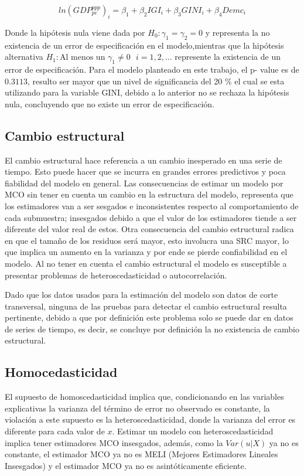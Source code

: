 \documentclass[11pt]{article}
\begin{document}
{$$ ln(GDP_{pc}^{ppp})_i = \beta_1 + \beta_2 IGI_i + \beta_3 GINI_i + \beta_4 Demc_i $$

Donde la hipótesis nula viene dada por $H_0 : \gamma_1 = \gamma_2 = 0$ y representa la no existencia de un error de especificación en el modelo,mientras que la hipótesis alternativa $H_1 : \text{Al menos un } \gamma_1 \neq 0 \ \ \ i=1,2,... $  represente la existencia de un error de especificación. Para el modelo planteado en este trabajo, el p- value es de $0.3113$, resulto ser mayor que un nivel de significancia del 20 \% el cual se esta utilizando para la variable GINI,  debido a lo anterior no se rechaza la hipótesis nula, concluyendo que no existe un error de especificación.


\subsection{Cambio estructural}

El cambio estructural hace referencia a un cambio inesperado en una serie de tiempo. Esto puede hacer que se incurra en grandes errores predictivos y poca fiabilidad del modelo en general. Las consecuencias de estimar un modelo por MCO sin tener en cuenta un cambio en la estructura del modelo, representa que los estimadores van a ser sesgados e inconsistentes respecto al comportamiento de cada submuestra; insesgados debido a que el valor de los estimadores tiende a ser diferente del valor real de estos. Otra consecuencia del cambio estructural radica en que el tamaño de los residuos será mayor, esto involucra una SRC mayor, lo que implica un aumento en la varianza y por ende se pierde confiabilidad en el modelo. Al no tener en cuenta el cambio estructural el modelo es susceptible a presentar problemas de heteroscedasticidad o autocorrelación.

Dado que los datos usados para la estimación del modelo son datos de corte transversal, ninguna de las pruebas para detectar el cambio estructural resulta pertinente, debido a que por definición este problema solo se puede dar en datos de series de tiempo, es decir, se concluye por definición la no existencia de cambio estructural.

\subsection{Homocedasticidad}

El supuesto de homoscedasticidad implica que, condicionando en las variables explicativas la varianza del término de error no observado es constante, la violación a este supuesto es la heteroscedasticidad, donde la varianza del error es diferente para cada valor de $x$. Estimar un modelo con heteroscedasticidad implica tener estimadores MCO insesgados, además, como la $Var(u|X)$ ya no es constante, el estimador MCO ya no es MELI (Mejores Estimadores Lineales Insesgados) y el estimador MCO ya no es asintóticamente eficiente.

}
\end{document}
